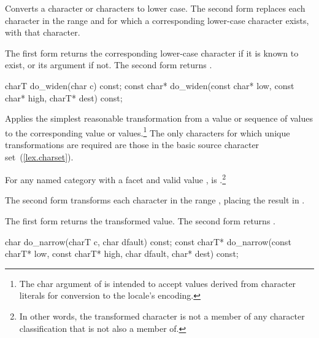 \begin{itemdescr}
\pnum
\effects
Converts a character or characters to lower case.
The second form replaces each character
in the range
and for which a corresponding lower-case character exists,
with that character.

\pnum
\returns
The first form returns the corresponding lower-case character if it
is known to exist, or its argument if not.
The second form returns .
\end{itemdescr}

%
\begin{itemdecl}
charT        do_widen(char c) const;
const char*  do_widen(const char* low, const char* high,
                      charT* dest) const;
\end{itemdecl}

\begin{itemdescr}
\pnum
\effects
Applies the simplest reasonable transformation from a
value or sequence of
values to the corresponding
value or values.\footnote{The char argument of
is intended to accept values derived from character literals for conversion
to the locale's encoding.}
The only characters for which unique transformations are required
are those in the basic source character set~(\ref{lex.charset}).

For any named
category with a
facet  and valid
value ,
is
.\footnote{In other words, the transformed character is not a member
of any character classification that  is not also a member of.}

The second form transforms each character
in the range
,
placing the result in
.

\pnum
\returns
The first form returns the transformed value.
The second form returns .
\end{itemdescr}

%
\begin{itemdecl}
char         do_narrow(charT c, char dfault) const;
const charT* do_narrow(const charT* low, const charT* high,
                       char dfault, char* dest) const;
\end{itemdecl}


